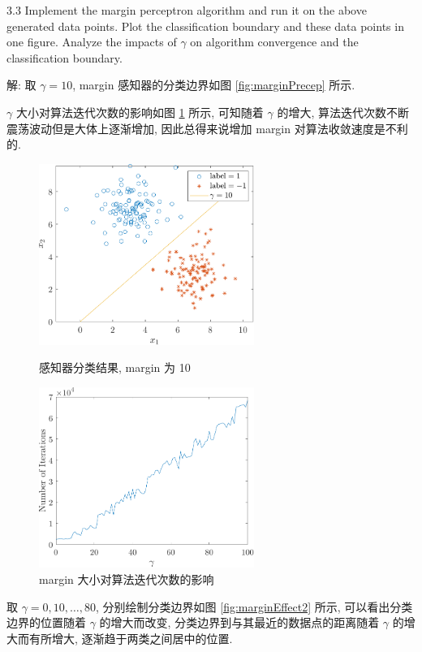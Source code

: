 \documentclass[openany]{ctexbook}
\theoremstyle{kaiti}
\theoremstyle{normal}
\begin{document}
3.3 Implement the margin perceptron algorithm and run it on the above generated data points. Plot the classification boundary and these data points in one figure. Analyze the impacts of $\gamma$ on algorithm convergence and the classification boundary.

解: 取 $\gamma=10$, margin 感知器的分类边界如图 \ref{fig:marginPrecep} 所示. 

$\gamma$ 大小对算法迭代次数的影响如图 \ref{fig:marginEffect} 所示, 可知随着 $\gamma$ 的增大, 算法迭代次数不断震荡波动但是大体上逐渐增加, 因此总得来说增加 margin 对算法收敛速度是不利的.

\begin{figure}[htbp]
  \centering
  \begin{minipage}[t]{0.48\textwidth}
  \centering
  \includegraphics[width=7cm]{marginPrecep.pdf}
  \caption{感知器分类结果, margin 为 10}
  \label{fig:marginPrecep}
  \end{minipage}
  \begin{minipage}[t]{0.48\textwidth}
  \centering
  \includegraphics[width=7cm]{marginEffect.pdf}
  \caption{margin 大小对算法迭代次数的影响}
  \label{fig:marginEffect}
  \end{minipage}
\end{figure}

取 $\gamma=0,10,\dots,80$, 分别绘制分类边界如图 \ref{fig:marginEffect2} 所示, 可以看出分类边界的位置随着 $\gamma$ 的增大而改变, 分类边界到与其最近的数据点的距离随着 $\gamma$ 的增大而有所增大, 逐渐趋于两类之间居中的位置.
\end{document}
